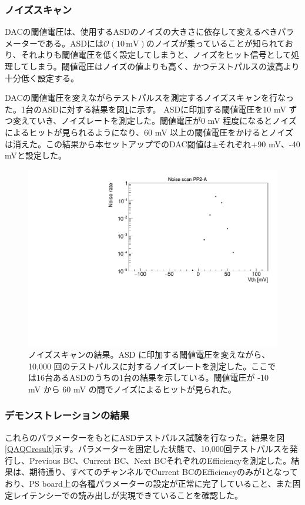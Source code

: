 \subsubsection{ノイズスキャン}
\baselineskip
DACの閾値電圧は、使用するASDのノイズの大きさに依存して変えるべきパラメーターである。ASDには$\mathcal{O}(10 \,\mathrm{mV})$のノイズが乗っていることが知られており、それよりも閾値電圧を低く設定してしまうと、ノイズをヒット信号として処理してしまう。閾値電圧はノイズの値よりも高く、かつテストパルスの波高より十分低く設定する。

DACの閾値電圧を変えながらテストパルスを測定するノイズスキャンを行なった。1台のASDに対する結果を図\ref{QAQCnoisescan}に示す。
ASDに印加する閾値電圧を10 mV ずつ変えていき、ノイズレートを測定した。閾値電圧が0 mV 程度になるとノイズによるヒットが見られるようになり、60 mV 以上の閾値電圧をかけるとノイズは消えた。この結果から本セットアップでのDAC閾値は$\pm$それぞれ+90 mV、-40 mVと設定した。
\begin{figure} 
\centering
\includegraphics[width=16cm]{fig/QAQC/noise_A2.pdf}
\caption[ノイズスキャンの結果]{ノイズスキャンの結果。ASD に印加する閾値電圧を変えながら、10,000 回のテストパルスに対するノイズレートを測定した。ここでは16台あるASDのうちの1台の結果を示している。閾値電圧が -10 mV から 60 mV の間でノイズによるヒットが見られた。}
\label{QAQCnoisescan}
\end{figure}

\subsubsection{デモンストレーションの結果}
\baselineskip
これらのパラメーターをもとにASDテストパルス試験を行なった。結果を図\ref{QAQCresult}示す。パラメーターを固定した状態で、10,000回テストパルスを発行し、Previous BC、Current BC、Next BCそれぞれのEfficiencyを測定した。結果は、期待通り、すべてのチャンネルでCurrent BCのEfficiencyのみが1となっており、PS board上の各種パラメーターの設定が正常に完了していること、また固定レイテンシーでの読み出しが実現できていることを確認した。

